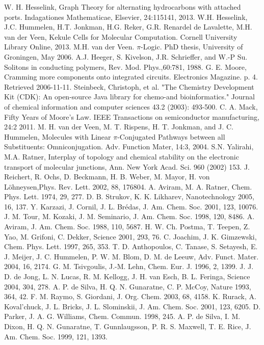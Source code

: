 \documentclass[12pt]{article}
\begin{document}
\begin{thebibliography}{abrv}

 W. H. Hesselink, Graph Theory for alternating hydrocarbons with attached ports. Indagationes Mathematicae, Elsevier, 24:115141, 2013.
 W.H. Hesselink, J.C. Hummelen, H.T. Jonkman, H.G. Reker, G.R. Renardel de Lavalette, M.H. van der Veen, Kekule Cells for Molecular Computation. Cornell University Library Online, 2013.
 M.H. van der Veen. $\pi$-Logic. PhD thesis, University of Groningen, May 2006.
 A.J. Heeger, S. Kivelson, J.R. Schrieffer, and W.-P Su. Solitons in conducting polymers, Rev. Mod. Phys.,60:781, 1988.
 G. E. Moore, Cramming more components onto integrated circuits. Electronics Magazine. p. 4. Retrieved 2006-11-11. 
 Steinbeck, Christoph, et al. "The Chemistry Development Kit (CDK): An open-source Java library for chemo-and bioinformatics." Journal of chemical information and computer sciences 43.2 (2003): 493-500.
 C. A. Mack, Fifty Years of Moore's Law. IEEE Transactions on semiconductor manufacturing, 24:2 2011.
 M. H. van der Veen, M. T. Rispens, H. T. Jonkman, and J. C. Hummelen, Molecules with Linear $\pi$-Conjugated Pathways between all Substituents: Omniconjugation. Adv. Function Mater, 14:3, 2004.
 S.N. Yalirahi, M.A. Ratner, Interplay of topology and chemical stability on the electronic transport of molecular junctions, Ann. New York Acad. Sci. 960 (2002) 153.
 J. Reichert, R. Ochs, D. Beckmann, H. B. Weber, M. Mayor, H. von Löhneysen,Phys. Rev. Lett. 2002, 88, 176804. 
 A. Aviram, M. A. Ratner, Chem. Phys. Lett. 1974, 29, 277.
 D. B. Strukov, K. K. Likharev, Nanotechnology 2005, 16, 137.
 Y. Karzazi, J. Cornil, J. L. Brédas, J. Am. Chem. Soc. 2001, 123, 10076.
 J. M. Tour, M. Kozaki, J. M. Seminario, J. Am. Chem. Soc. 1998, 120, 8486.
 A. Aviram, J. Am. Chem. Soc. 1988, 110, 5687.
 H. W. Ch. Postma, T. Teepen, Z. Yao, M. Grifoni, C. Dekker, Science 2001, 293, 76.
 C. Joachim, J. K. Gimzewski, Chem. Phys. Lett. 1997, 265, 353.
 T. D. Anthopoulos, C. Tanase, S. Setayesh, E. J. Meijer, J. C. Hummelen, P. W. M. Blom, D. M. de Leeuw, Adv. Funct. Mater. 2004, 16, 2174.
 G. M. Tsivgoulis, J.-M. Lehn, Chem. Eur. J. 1996, 2, 1399.
 J. J. D. de Jong, L. N. Lucas, R. M. Kellogg, J. H. van Esch, B. L. Feringa, Science 2004, 304, 278.
 A. P. de Silva, H. Q. N. Gunaratne, C. P. McCoy, Nature 1993, 364, 42.
 F. M. Raymo, S. Giordani, J. Org. Chem. 2003, 68, 4158.
 K. Rurack, A. Koval'chuck, J. L. Bricks, J. L. Slominskii, J. Am. Chem. Soc. 2001, 123, 6205.
 D. Parker, J. A. G. Williams, Chem. Commun. 1998, 245.
 A. P. de Silva, I. M. Dixon, H. Q. N. Gunaratne, T. Gunnlaugsson, P. R. S. Maxwell, T. E. Rice, J. Am. Chem. Soc. 1999, 121, 1393.


\end{thebibliography}
\end{document}
